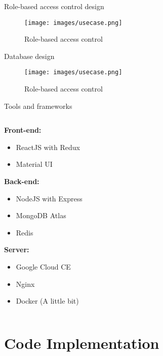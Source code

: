 \documentclass{beamer}
\begin{document}
\begin{frame}{Role-based access control design}
\begin{figure}[htp]
    \centering
    \texttt{[image: images/usecase.png]}
    \caption{Role-based access control}
    \label{fig:sysarch}
\end{figure}
\end{frame}

\begin{frame}{Database design}
\begin{figure}[htp]
    \centering
    \texttt{[image: images/usecase.png]}
    \caption{Role-based access control}
    \label{fig:sysarch}
\end{figure}
\end{frame}

\begin{frame}{Tools and frameworks}
    \begin{columns}
    \linespread{1.0}
    \begin{column}{5cm}
        \textbf{Front-end:}
        \begin{itemize}
            \item ReactJS with Redux
            \item Material UI
        \end{itemize}
        \textbf{Back-end: }
        \begin{itemize}
            \item NodeJS with Express
            \item MongoDB Atlas
            \item Redis
        \end{itemize}
        \textbf{Server: }
        \begin{itemize}
            \item Google Cloud CE
            \item Nginx
            \item Docker (A little bit)
        \end{itemize}
    \end{column}
    \begin{column}{5cm}

    \end{column}
    \end{columns}
\end{frame}

\section{Code Implementation}
	
\end{document}

